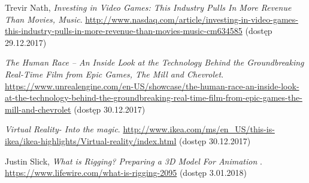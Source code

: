 \documentclass[multip]{SGGW-thesis}
\begin{document}
\begin{thebibliography}{9}
Trevir Nath, \textit{Investing in Video Games: This Industry Pulls In More Revenue Than Movies, Music}.
\url{http://www.nasdaq.com/article/investing-in-video-games-this-industry-pulls-in-more-revenue-than-movies-music-cm634585} {\mbox(dostęp 29.12.2017)}

\textit{The Human Race – An Inside Look at the Technology Behind the Groundbreaking Real-Time Film from Epic Games, The Mill and Chevrolet}. \url{https://www.unrealengine.com/en-US/showcase/the-human-race-an-inside-look-at-the-technology-behind-the-groundbreaking-real-time-film-from-epic-games-the-mill-and-chevrolet} (dostęp 30.12.2017)

\textit{Virtual Reality- Into the magic}. \url{http://www.ikea.com/ms/en_US/this-is-ikea/ikea-highlights/Virtual-reality/index.html} (dostęp 30.12.2017)

Justin Slick, \textit{What is Rigging? Preparing a 3D Model For Animation }. \url{https://www.lifewire.com/what-is-rigging-2095}  (dostęp 3.01.2018)






\end{thebibliography}


\beforelastpage
 \thispagestyle{empty} \newpage \null \thispagestyle{empty}
\end{document}
